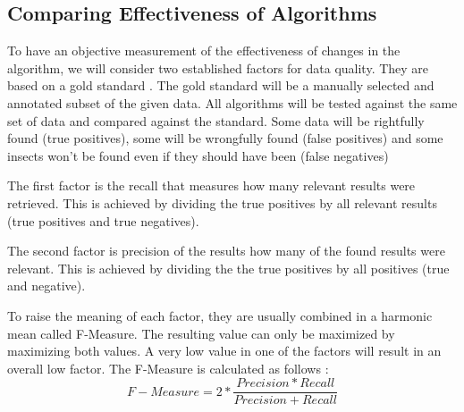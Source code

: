 \subsection{Comparing Effectiveness of Algorithms}
To have an objective measurement of the effectiveness of changes in the algorithm, we will consider two established factors for data quality.
They are based on a gold standard \cite{gold_standard}.
The gold standard will be a manually selected and annotated subset of the given data. 
All algorithms will be tested against the same set of data and compared against the standard.
Some data will be rightfully found (true positives), some will be wrongfully found (false positives) and some insects won't be found even if they should have been (false negatives)

The first factor is the recall that measures how many relevant results were retrieved. 
This is achieved by dividing the true positives by all relevant results (true positives and true negatives).

The second factor is precision of the results how many of the found results were relevant. 
This is achieved by dividing the the true positives by all positives (true and negative).

To raise the meaning of each factor, they are usually combined in a harmonic mean called F-Measure. 
The resulting value can only be maximized by maximizing both values. 
A very low value in one of the factors will result in an overall low factor. 
The F-Measure is calculated as follows \cite{f_measure}: 
\[
F-Measure = 2*\frac{Precision*Recall}{Precision+Recall}
\]


